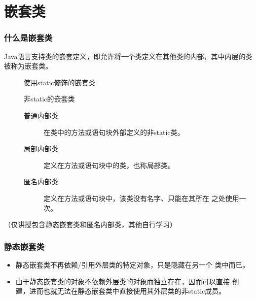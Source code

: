 \section{嵌套类}
\begin{frame}[fragile] %
  \frametitle{什么是嵌套类}

  Java语言支持类的嵌套定义，即允许将一个类定义在其他类的内部，其中内层的类被称为嵌套类。

  
  \begin{description}
  \item[] 使用static修饰的嵌套类
  \item[] 非static的嵌套类
    \begin{description}
    \item[普通内部类] 在类中的方法或语句块外部定义的非static类。
    \item[局部内部类] 定义在方法或语句块中的类，也称局部类。
    \item[匿名内部类] 定义在方法或语句块中，该类没有名字、只能在其所在
      之处使用一次。
    \end{description}
  \end{description}

  {\kai （仅讲授包含静态嵌套类和匿名内部类，其他自行学习）}
  
\end{frame}


\begin{frame}[fragile] %
  \frametitle{静态嵌套类}

  
  \begin{itemize}
  \item {\hei 静态嵌套类不再依赖/引用外层类的特定对象，只是隐藏在另一个
      类中而已。}
  \item 由于静态嵌套类的对象不依赖外层类的对象而独立存在，因而可以直接
    创建，进而也就无法在静态嵌套类中直接使用其外层类的非static成员。
  \end{itemize}

\end{frame}

